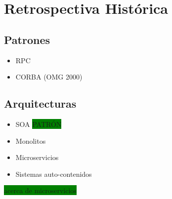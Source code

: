 \section{Retrospectiva Histórica}

\subsection{Patrones}

\begin{itemize}
  \item RPC %
  \item CORBA (OMG 2000) %
\end{itemize}

\subsection{Arquitecturas}

\begin{itemize}
  \item SOA \colorbox{green}{PATRÓN}
  \item Monolitos
  \item Microservicios
  \item Sistemas auto-contenidos
\end{itemize}

\colorbox{green}{acerca de microservicios}

